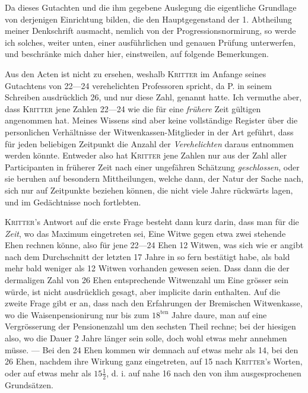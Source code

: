 \par{}
Da dieses Gutachten und die ihm gegebene Auslegung die eigentliche Grundlage von derjenigen Einrichtung bilden, die den Hauptgegenstand der 1. Abtheilung meiner Denkschrift ausmacht, nemlich von der Progressionsnormirung, so werde ich solches, weiter unten, einer ausführlichen und genauen Prüfung unterwerfen, und beschränke mich daher hier, einstweilen, auf folgende Bemerkungen.

Aus den Acten ist nicht zu ersehen, weshalb \textsc{Kritter} im Anfange seines Gutachtens von 22—24 verehelichten Professoren spricht, da P. in seinem Schreiben ausdrücklich 26, und nur diese Zahl, genannt hatte. Ich vermuthe aber, dass \textsc{Kritter} jene Zahlen 22—24 wie die für eine \textit{frühere} Zeit gültigen angenommen hat. Meines Wissens sind aber keine vollständige Register über die personlichen Verhältnisse der Witwenkassen-Mitglieder in der Art geführt, dass für jeden beliebigen Zeitpunkt die Anzahl der \textit{Verehelichten} daraus entnommen werden könnte. Entweder also hat \textsc{Kritter} jene Zahlen nur aus der Zahl aller Participanten in früherer Zeit nach einer ungefähren Schätzung \textit{geschlossen}, oder sie beruhen auf besondern Mittheilungen, welche dann, der Natur der Sache nach, sich nur auf Zeitpunkte beziehen können, die nicht viele Jahre rückwärts lagen, und im Gedächtnisse noch fortlebten.

\textsc{Kritter}’s Antwort auf die erste Frage besteht dann kurz darin, dass man für die \textit{Zeit}, wo das Maximum eingetreten sei, Eine Witwe gegen etwa zwei stehende Ehen rechnen könne, also für jene 22—24 Ehen 12 Witwen, was sich wie er angibt nach dem Durchschnitt der letzten 17 Jahre in so fern bestätigt habe, als bald mehr bald weniger als 12 Witwen vorhanden gewesen seien. Dass dann die der dermaligen Zahl von 26 Ehen entsprechende Witwenzahl um Eine grösser sein würde, ist nicht ausdrücklich gesagt, aber implicite darin enthalten. Auf die zweite Frage gibt er an, dass nach den Erfahrungen der Bremischen Witwenkasse, wo die Waisenpensionirung nur bis zum \(18^{\text{ten}}\) Jahre daure, man auf eine Vergrösserung der Pensionenzahl um den sechsten Theil rechne; bei der hiesigen also, wo die Dauer 2 Jahre länger sein solle, doch wohl etwas mehr annehmen müsse. — Bei den 24 Ehen kommen wir demnach auf etwas mehr als 14, bei den 26 Ehen, nachdem ihre Wirkung ganz eingetreten, auf 15 nach \textsc{Kritter}’s Worten, oder auf etwas mehr als \(15\tfrac12\), d. i. auf nahe 16 nach den von ihm ausgesprochenen Grundsätzen.

